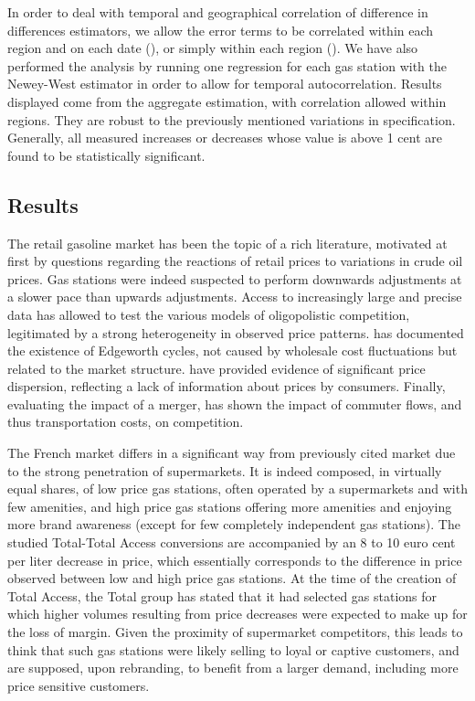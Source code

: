 \documentclass[english]{article}
\begin{document}
In order to deal with temporal and geographical correlation of difference in differences estimators, we allow the error terms to be correlated within each region and on each date  (\cite{BER04}), or simply within each region (\cite{CAM15}). We have also performed the analysis by running one regression for each gas station with the Newey-West estimator in order to allow for temporal autocorrelation. Results displayed come from the aggregate estimation, with correlation allowed within regions. They are robust to the previously mentioned variations in specification. Generally, all measured increases or decreases whose value is above 1 cent are found to be statistically significant.

\subsection{Results}

The retail gasoline market has been the topic of a rich literature, motivated at first by questions regarding the reactions of retail prices to variations in crude oil prices. Gas stations were indeed suspected to perform downwards adjustments at a slower pace than upwards adjustments. Access to increasingly large and precise data has allowed to test the various models of oligopolistic competition, legitimated by a strong heterogeneity in observed price patterns. \cite{ECK13} has documented the existence of Edgeworth cycles, not caused by wholesale cost fluctuations but related to the market structure. \cite{CHA11} have provided evidence of significant price dispersion, reflecting a lack of information about prices by consumers. Finally, evaluating the impact of a merger, \cite{HOU12} has shown the impact of commuter flows, and thus transportation costs, on competition.\medskip{}

The French market differs in a significant way from previously cited market due to the strong penetration of supermarkets. It is indeed composed, in virtually equal shares, of low price gas stations, often operated by a supermarkets and with few amenities, and high price gas stations offering more amenities and enjoying more brand awareness (except for few completely independent gas stations). The studied Total-Total Access conversions are accompanied by an 8 to 10 euro cent per liter decrease in price, which essentially corresponds to the difference in price observed between low and high price gas stations. At the time of the creation of Total Access, the Total group has stated that it had selected gas stations for which higher volumes resulting from price decreases were expected to make up for the loss of margin. Given the proximity of supermarket competitors, this leads to think that such gas stations were likely selling to loyal or captive customers, and are supposed, upon rebranding, to benefit from a larger demand, including more price sensitive customers.\medskip{}
\end{document}
